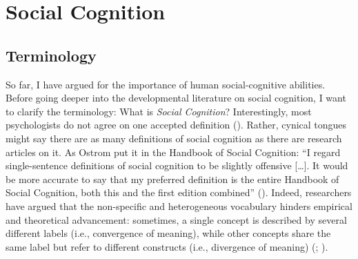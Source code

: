\documentclass[
]{scrbook}
\begin{document}
\section{Social Cognition}\label{intro-socialcognition}

\subsection{Terminology}\label{terminology}

So far, I have argued for the importance of human social-cognitive abilities. Before going deeper into the developmental literature on social cognition, I want to clarify the terminology: What is \emph{Social Cognition}? Interestingly, most psychologists do not agree on one accepted definition (). Rather, cynical tongues might say there are as many definitions of social cognition as there are research articles on it. As Ostrom put it in the Handbook of Social Cognition: ``I regard single-sentence definitions of social cognition to be slightly offensive {[}\ldots{]}. It would be more accurate to say that my preferred definition is the entire Handbook of Social Cognition, both this and the first edition combined'' (). Indeed, researchers have argued that the non-specific and heterogeneous vocabulary hinders empirical and theoretical advancement: sometimes, a single concept is described by several different labels (i.e., convergence of meaning), while other concepts share the same label but refer to different constructs (i.e., divergence of meaning) (; ).
\end{document}
